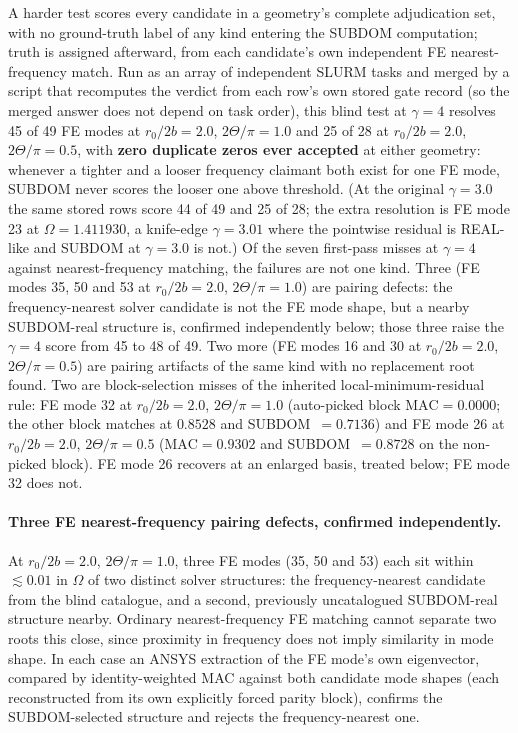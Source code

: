 \documentclass[11pt]{article}
\begin{document}
A harder test scores every candidate in a geometry's complete
adjudication set, with no ground-truth label of any kind entering the
SUBDOM computation; truth is assigned afterward, from each candidate's own
independent FE nearest-frequency match. Run as an array of independent
SLURM tasks and merged by a script that recomputes the verdict from each
row's own stored gate record (so the merged answer does not depend on
task order), this blind test at $\gamma=4$ resolves 45 of 49 FE modes at
$r_0/2b=2.0$, $2\Theta/\pi=1.0$ and 25 of 28 at $r_0/2b=2.0$,
$2\Theta/\pi=0.5$, with
\textbf{zero duplicate zeros ever accepted} at either geometry: whenever a
tighter and a looser frequency claimant both exist for one FE mode, SUBDOM
never scores the looser one above threshold. (At the original $\gamma=3.0$ the
same stored rows score 44 of 49 and 25 of 28; the extra resolution is FE
mode 23 at $\Omega=1.411930$, a knife-edge $\gamma=3.01$ where the pointwise
residual is REAL-like and SUBDOM at $\gamma=3.0$ is not.) Of the seven
first-pass misses at $\gamma=4$ against nearest-frequency matching, the
failures are not one kind. Three (FE modes 35, 50 and 53 at
$r_0/2b=2.0$, $2\Theta/\pi=1.0$) are pairing defects: the
frequency-nearest solver candidate is not the FE mode shape, but a
nearby SUBDOM-real structure is, confirmed independently below; those
three raise the $\gamma=4$ score from 45 to 48 of 49. Two more (FE modes 16
and 30 at $r_0/2b=2.0$, $2\Theta/\pi=0.5$) are pairing artifacts of
the same kind with no replacement root found. Two are block-selection misses of the inherited
local-minimum-residual rule: FE mode 32 at $r_0/2b=2.0$,
$2\Theta/\pi=1.0$ (auto-picked block $\mathrm{MAC}=0.0000$; the other
block matches at $0.8528$ and SUBDOM~$=0.7136$) and FE mode 26 at
$r_0/2b=2.0$, $2\Theta/\pi=0.5$ ($\mathrm{MAC}=0.9302$ and
SUBDOM~$=0.8728$ on the non-picked block). FE mode 26 recovers at an
enlarged basis, treated below; FE mode 32 does not.

\paragraph{Three FE nearest-frequency pairing defects, confirmed independently.}
At $r_0/2b=2.0$, $2\Theta/\pi=1.0$, three FE modes (35, 50 and 53) each sit
within $\lesssim0.01$ in $\Omega$ of two distinct solver structures: the
frequency-nearest candidate from the blind catalogue, and a second,
previously uncatalogued SUBDOM-real structure nearby. Ordinary
nearest-frequency FE matching cannot separate two roots this close, since
proximity in frequency does not imply similarity in mode shape. In each
case an ANSYS extraction of the FE mode's own eigenvector, compared by
identity-weighted MAC against both candidate mode shapes (each
reconstructed from its own explicitly forced parity block), confirms the
SUBDOM-selected structure and rejects the frequency-nearest one.
\end{document}
